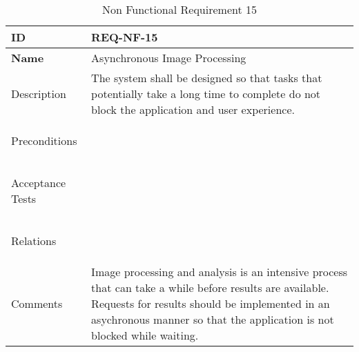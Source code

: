 \begin{table}[H]
    \begin{tabular}[t]{ | >{\bfseries}l | p{9.5cm} |}

    \hline
    ID
    &  REQ-NF-15 \\ \hline

    Name
    & Asynchronous Image Processing \\ \hline

    Description
    & The system shall be designed so that tasks that potentially take a long time to complete do not block the application and user experience. \\ \hline

    Preconditions
    &  \\ \hline

    Acceptance Tests
    & \\ \hline

    Relations
    &  \\ \hline

    Comments
    & Image processing and analysis is an intensive process that can take a while before results are available. Requests for results should be implemented in an asychronous manner so that the application is not blocked while waiting.  \\ \hline

    \end{tabular}

    \caption{Non Functional Requirement 15}
    \label{fig:req_nf_15}

\end{table}